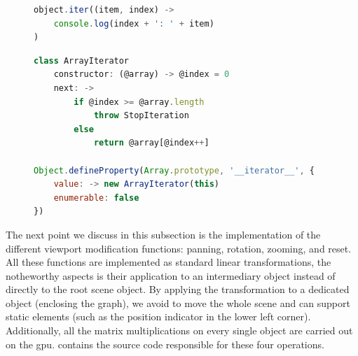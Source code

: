 \begin{figure}
\begin{lstlisting}[caption={Simple iteration over an iterable object.},label=lst:iteration,language=javascript]
object.iter((item, index) ->
    console.log(index + ': ' + item)
)
\end{lstlisting}
\end{figure}

\begin{figure}
\begin{lstlisting}[caption={Extension of the \texttt{Array} object with the iterator pattern.},label=lst:array-iter,language=javascript]
class ArrayIterator
    constructor: (@array) -> @index = 0
    next: ->
        if @index >= @array.length
            throw StopIteration
        else
            return @array[@index++]

Object.defineProperty(Array.prototype, '__iterator__', {
    value: -> new ArrayIterator(this)
    enumerable: false
})
\end{lstlisting}
\end{figure}

The next point we discuss in this subsection is the implementation of the different viewport modification functions: panning, rotation, zooming, and reset. All these functions are implemented as standard linear transformations, the notheworthy aspects is their application to an intermediary object instead of directly to the root scene object. By applying the transformation to a dedicated object (enclosing the graph), we avoid to move the whole scene and can support static elements (such as the position indicator in the lower left corner). Additionally, all the matrix multiplications on every single object are carried out on the \gls{gpu}.  contains the source code responsible for these four operations.

